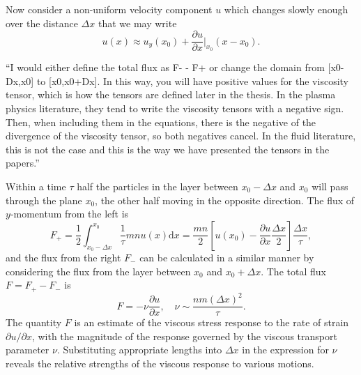 Now consider a non-uniform velocity component $u$ which changes slowly enough over the distance $\Delta x$ that we may write
\begin{equation}
  \label{eq:viscous_derivation_vy}
u (x) \approx u_y(x_0) + \frac{\partial u}{\partial x} \bigg| _{x_0} (x - x_0).
\end{equation}


``I would either define the total flux as F- - F+ or change the domain from [x0-Dx,x0] to [x0,x0+Dx]. In this way, you will have positive values for the viscosity tensor, which is how the tensors are defined later in the thesis. In the plasma physics literature, they tend to write the viscosity tensors with a negative sign. Then, when including them in the equations, there is the negative of the divergence of the viscosity tensor, so both negatives cancel. In the fluid literature, this is not the case and this is the way we have presented the tensors in the papers.''

Within a time $\tau$ half the particles in the layer between $x_0 - \Delta x$ and $x_0$ will pass through the plane $x_0$, the other half moving in the opposite direction. The flux of $y$-momentum from the left is
\begin{equation}
  \label{eq:momentum_flux_left}
F_{+} = \frac{1}{2} \int^{x_0}_{x_0 - \Delta x} \frac{1}{\tau} m n u(x) \text{d}x = \frac{mn}{2} \left[ u(x_0) - \frac{\partial u}{\partial x} \frac{\Delta x}{2} \right] \frac{\Delta x}{\tau},
\end{equation}
and the flux from the right $F_{-}$ can be calculated in a similar manner by considering the flux from the layer between $x_0$ and $x_0 + \Delta x$. The total flux $F = F_+ - F_-$ is
\begin{equation}
  \label{eq:total_momentum_flux}
  F = - \nu \frac{\partial u}{\partial x}, \quad \nu \sim \frac{nm(\Delta x)^2}{\tau}.
\end{equation}
The quantity $F$ is an estimate of the viscous stress response to the rate of strain $\partial u / \partial x$, with the magnitude of the response governed by the viscous transport parameter $\nu$. Substituting appropriate lengths into $\Delta x$ in the expression for $\nu$ reveals the relative strengths of the viscous response to various motions. 

